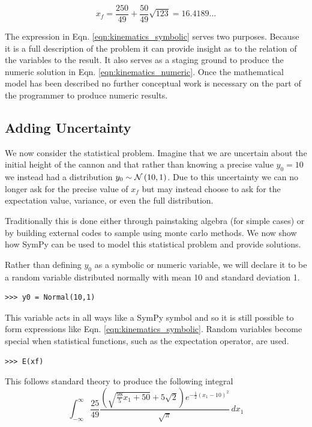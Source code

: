 \begin{equation}
\label{eqn:kinematics_numeric}
x_f = \frac{250}{49} + \frac{50}{49} \sqrt{123} = 16.4189...
\end{equation}

The expression in Eqn. \ref{eqn:kinematics_symbolic} serves two purposes. Because it is a full description of the problem it can provide insight as to the relation of the variables to the result. It also serves as a staging ground to produce the numeric solution in Eqn. \ref{eqn:kinematics_numeric}. Once the mathematical model has been described no further conceptual work is necessary on the part of the programmer to produce numeric results. 

\subsection{Adding Uncertainty}

We now consider the statistical problem. Imagine that we are uncertain about the initial height of the cannon and that rather than knowing a precise value $y_0 = 10$ we instead had a distribution $y_0 \sim \mathcal{N}\left(10, 1\right)$. Due to this uncertainty we can no longer ask for the precise value of $x_f$ but may instead choose to ask for the expectation value, variance, or even the full distribution. 

Traditionally this is done either through painstaking algebra (for simple cases) or by building external codes to sample using monte carlo methods. We now show how SymPy can be used to model this statistical problem and provide solutions. 

Rather than defining $y_0$ as a symbolic or numeric variable, we will declare it to be a random variable distributed normally with mean 10 and standard deviation 1. 
\begin{lstlisting}
>>> y0 = Normal(10,1)
\end{lstlisting}

This variable acts in all ways like a SymPy symbol and so it is still possible to form expressions like Eqn. \ref{eqn:kinematics_symbolic}. Random variables become special when statistical functions, such as the expectation operator, are used.

\begin{lstlisting}
>>> E(xf)
\end{lstlisting}

This follows standard theory to produce the following integral
$$\int_{-\infty}^{\infty} \frac{25}{49} \frac{\left(\sqrt{\frac{98}{5} x_{1} + 50} + 5 \sqrt{2}\right) e^{- \frac{1}{2} \left(x_{1} -10\right)^{2}}}{\sqrt{\pi}}\, dx_{1}$$

